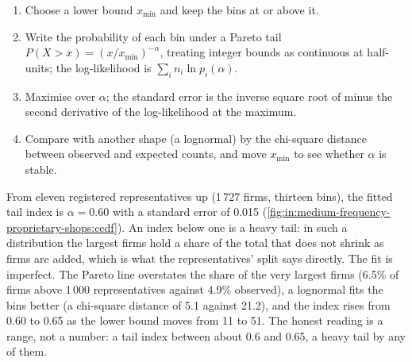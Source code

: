 \begin{method}\label{met:in:medium-frequency-proprietary-shops:fit}
\begin{enumerate}
\item Choose a lower bound $x_{\min}$ and keep the bins at or above it.
\item Write the probability of each bin under a Pareto tail $P(X>x)=(x/x_{\min})^{-\alpha}$, treating integer bounds as
continuous at half-units; the log-likelihood is $\sum_i n_i\ln p_i(\alpha)$.
\item Maximise over $\alpha$; the standard error is the inverse square root of minus the second derivative of the
log-likelihood at the maximum.
\item Compare with another shape (a lognormal) by the chi-square distance between observed and expected counts, and
move $x_{\min}$ to see whether $\alpha$ is stable.
\end{enumerate}
\end{method}

From eleven registered representatives up (1\,727 firms, thirteen bins), the fitted tail index is $\alpha=0.60$ with a
standard error of 0.015 (\cref{fig:in:medium-frequency-proprietary-shops:ccdf}). An index below one is a heavy tail: in
such a distribution the largest firms hold a share of the total that does not shrink as firms are added, which is what
the representatives' split says directly. The fit is imperfect. The Pareto line overstates the share of the very
largest firms (6.5\% of firms above 1\,000 representatives against 4.9\% observed), a lognormal fits the bins better (a
chi-square distance of 5.1 against 21.2), and the index rises from 0.60 to 0.65 as the lower bound moves from 11 to 51.
The honest reading is a range, not a number: a tail index between about 0.6 and 0.65, a heavy tail by any of them.

